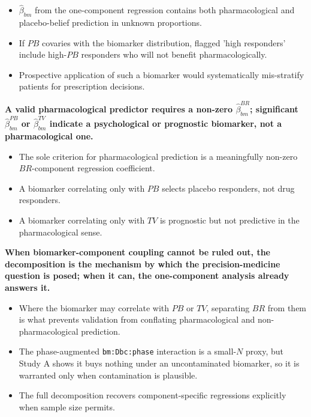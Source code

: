 \documentclass[
  11pt,
]{article}
\begin{document}
\begin{itemize}\setlength{\itemsep}{2pt}\setlength{\parskip}{0pt}
\item $\hat\beta_{bm}$ from the one-component regression contains both pharmacological and placebo-belief prediction in unknown proportions.
\item If $PB$ covaries with the biomarker distribution, flagged 'high responders' include high-$PB$ responders who will not benefit pharmacologically.
\item Prospective application of such a biomarker would systematically mis-stratify patients for prescription decisions.
\end{itemize}

\textbf{A valid pharmacological predictor requires a non-zero $\hat\beta_{bm}^{BR}$; significant $\hat\beta_{bm}^{PB}$ or $\hat\beta_{bm}^{TV}$ indicate a psychological or prognostic biomarker, not a pharmacological one.}

\begin{itemize}\setlength{\itemsep}{2pt}\setlength{\parskip}{0pt}
\item The sole criterion for pharmacological prediction is a meaningfully non-zero $BR$-component regression coefficient.
\item A biomarker correlating only with $PB$ selects placebo responders, not drug responders.
\item A biomarker correlating only with $TV$ is prognostic but not predictive in the pharmacological sense.
\end{itemize}

\textbf{When biomarker-component coupling cannot be ruled out, the decomposition is the mechanism by which the precision-medicine question is posed; when it can, the one-component analysis already answers it.}

\begin{itemize}\setlength{\itemsep}{2pt}\setlength{\parskip}{0pt}
\item Where the biomarker may correlate with $PB$ or $TV$, separating $BR$ from them is what prevents validation from conflating pharmacological and non-pharmacological prediction.
\item The phase-augmented \texttt{bm:Dbc:phase} interaction is a small-$N$ proxy, but Study A shows it buys nothing under an uncontaminated biomarker, so it is warranted only when contamination is plausible.
\item The full decomposition recovers component-specific regressions explicitly when sample size permits.
\end{itemize}
\end{document}
